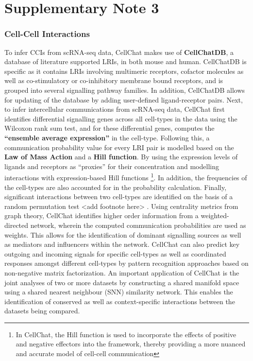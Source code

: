 \section{Supplementary Note 3}
\label{sec:suppnote3}

\subsubsection{Cell-Cell Interactions}


To infer CCIs from scRNA-seq data, CellChat makes use of \textbf{CellChatDB}, a database of literature supported LRIs, in both mouse and human. CellChatDB is specific as it contains LRIs involving multimeric receptors, cofactor molecules as well as co-stimulatory or co-inhibitory membrane bound receptors, and is grouped into several signalling pathway families. In addition, CellChatDB allows for updating of the database by adding user-defined ligand-receptor pairs. Next, to infer intercellular communications from scRNA-seq data, CellChat first identifies differential signalling genes across all cell-types in the data using the Wilcoxon rank sum test, and for these differential genes, computes the \textbf{“ensemble average expression”} in the cell-type. Following this, a communication probability value for every LRI pair is modelled based on the \textbf{Law of Mass Action} and a \textbf{Hill function}. By using the expression levels of ligands and receptors as “proxies” for their concentration and modelling interactions with expression-based Hill functions \footnote{In CellChat, the Hill function is used to incorporate the effects of positive and negative effectors into the framework, thereby providing a more nuanced and accurate model of cell-cell communication}. In addition, the frequencies of the cell-types are also accounted for in the probability calculation. Finally, significant interactions between two cell-types are identified on the basis of a random permutation test <add footnote here>   . Using centrality metrics from graph theory, CellChat identifies higher order information from a weighted-directed network, wherein the computed communication probabilities are used as weights. This allows for the identification of dominant signalling sources as well as mediators and influencers within the network. CellChat can also predict key outgoing and incoming signals for specific cell-types as well as coordinated responses amongst different cell-types by pattern recognition approaches based on non-negative matrix factorization. An important application of CellChat is the joint analyses of two or more datasets by constructing a shared manifold space using a shared nearest neighbour (SNN) similarity network. This enables the identification of conserved as well as context-specific interactions between the datasets being compared.    
